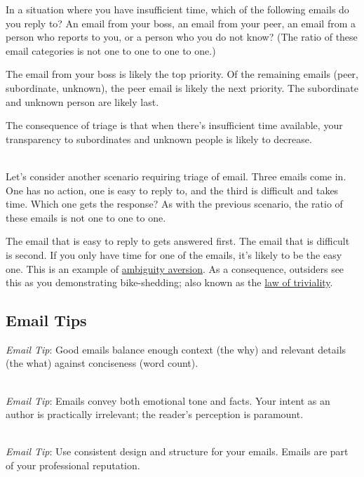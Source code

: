 In a situation where you have insufficient time, which of the following emails do you reply to? An email from your boss, an email from your peer, an email from a person who reports to you, or a person who you do not know?
(The ratio of these email categories is not one to one to one to one.)

The email from your boss is likely the top priority. Of the remaining emails (peer, subordinate, unknown), the peer email is likely the next priority.
The subordinate and unknown person are likely last.

The consequence of triage is that when there's insufficient time available, your transparency to subordinates and unknown people is likely to decrease. 

\ \\
Let's consider another scenario requiring triage of email. Three emails come in. One has no action, one is easy to reply to, and the third is difficult and takes time. Which one gets the response?
As with the previous scenario, the ratio of these emails is not one to one to one.

The email that is easy to reply to gets answered first.  The email that is difficult is second.
If you only have time for one of the emails, it's likely to be the easy one. This is an example of 
\href{https://en.wikipedia.org/wiki/Ambiguity_aversion}{ambiguity aversion}.
As a consequence, outsiders see this as you demonstrating bike-shedding; also known as the
\href{https://en.wikipedia.org/wiki/Law_of_triviality}{law of triviality}.



\subsection*{Email Tips\label{sec:email-structure}}

\textit{Email Tip}: Good emails balance enough context (the why) and relevant details (the what) against conciseness (word count). 

\ \\
\textit{Email Tip}: Emails convey both emotional tone and facts. Your intent as an author is practically irrelevant; the reader's perception is paramount. 



\ \\
\textit{Email Tip}: Use consistent design and structure for your emails. Emails are part of your professional reputation.

